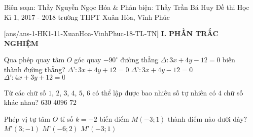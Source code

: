 	\begin{name}
{Biên soạn: Thầy Nguyễn Ngọc Hóa \& Phản biện: Thầy Trần Bá Huy}
		{Đề thi Học Kì 1, 2017 - 2018 trường THPT Xuân Hòa, Vĩnh Phúc}
	\end{name}
	\setcounter{ex}{0}\setcounter{bt}{0}
	[ans/ans-1-HK1-11-XuanHoa-VinhPhuc-18-TL-TN]
\noindent\textbf{I. PHẦN TRẮC NGHIỆM}
\begin{ex}%
	Qua phép quay tâm $O$ góc quay $-90^\circ$ đường thẳng $\Delta\colon 3x+4y-12=0$ biến thành đường thẳng?
	\choice
	{$\Delta\text{'}\colon 3x+4y+12=0$}
	{$\Delta\text{'}\colon 3x+4y-12=0$}
	{}
	{$\Delta\text{'}\colon 4x+3y+12=0$}
\end{ex}

\begin{ex}%
	Từ các chữ số $1$, $2$, $3$, $4$, $5$, $6$ có thể lập được bao nhiêu số tự nhiên có $4$ chữ số khác nhau?
	\choice
	{$630$}
	{}
	{$4096$}
	{$72$}
\end{ex}

\begin{ex}%
	Phép vị tự tâm $O$ tỉ số $k=-2$ biến điểm $M(-3;1)$ thành điểm nào dưới đây?
	\choice
	{$M\text{'}(3;-1)$}
	{$M\text{'}(-6;2)$}
	{$M\text{'}(-3;1)$}
	{}
\end{ex}

